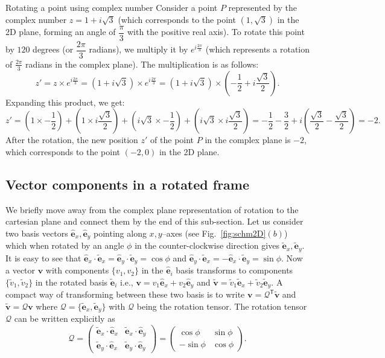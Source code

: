 \documentclass{article}
\def\eh{\hat{\mathbf{e}}}
\def\et{\tilde{\mathbf{e}}}
\def\ehx{\hat{\mathbf{e}}_x}
\def\ehy{\hat{\mathbf{e}}_y}
\def\etx{\tilde{\mathbf{e}}_x}
\def\ety{\tilde{\mathbf{e}}_y}
\def\v{\mathbf{v}}
\def\vt{\tilde{\mathbf{v}}}
\def\vts{\tilde{v}}
\def\Q{\mathcal{Q}}
\def\T{\mathsf{T}}
\begin{document}
\begin{egsBox}[label={egs:rot2Dex1}, float, floatplacement=t]{Rotating a point using complex number}
  \footnotesize
  Consider a point $P$ represented by the complex number $z = 1 + i\sqrt{3}$ (which corresponds to the point $(1, \sqrt{3})$ in the 2D plane, forming an angle of $\dfrac{\pi}{3}$ with the positive real axis). To rotate this point by $120$ degrees (or $\dfrac{2\pi}{3}$ radians), we multiply it by $e^{i\frac{2\pi}{3}}$ (which represents a rotation of $\frac{2\pi}{3}$ radians in the complex plane).
  The multiplication is as follows:
  \[
  z' = z \times e^{i\frac{2\pi}{3}} = (1 + i\sqrt{3}) \times e^{i\frac{2\pi}{3}} = (1 + i\sqrt{3}) \times \left(-\frac{1}{2} + i\frac{\sqrt{3}}{2}\right).
  \]
  Expanding this product, we get:
  \[
  z' = \left(1 \times -\frac{1}{2}\right) + \left(1 \times i\frac{\sqrt{3}}{2}\right) + \left(i\sqrt{3} \times -\frac{1}{2}\right) + \left(i\sqrt{3} \times i\frac{\sqrt{3}}{2}\right) = -\frac{1}{2} - \frac{3}{2} + i\left(\frac{\sqrt{3}}{2} - \frac{\sqrt{3}}{2}\right) = -2.
  \]
  After the rotation, the new position $z'$ of the point $P$ in the complex plane is $-2$, which corresponds to the point $(-2, 0)$ in the 2D plane.
\end{egsBox}

\subsection{Vector components in a rotated frame}\label{sec:VecComp2D}
We briefly move away from the complex plane representation of rotation to the cartesian plane and connect them by the end of this sub-section. Let us consider two basis vectors $\ehx, \ehy$ pointing along $x, y$--axes (see Fig.~\ref{fig:schm2D}$(b)$) which when rotated by an angle $\phi$ in the counter-clockwise direction gives $\etx, \ety$. It is easy to see that $\ehx\cdot\etx=\ehy\cdot\ety=\cos \phi$ and $\ehy\cdot\etx = -\ehx\cdot\ety = \sin \phi$. Now a vector $\v$ with components $\{ v_1, v_2 \}$ in the $\eh_i$ basis transforms to components $\{ \vts_1, \vts_2 \}$ in the rotated basis $\et_i$ i.e., $\v = v_1 \ehx + v_2 \ehy$ and $\vt = \vts_1 \etx + \vts_2 \ety$. A compact way of transforming between these two basis is to write $\v = \Q^\T \vt$ and $\vt = \Q \v$ where $\Q = \{ \etx, \ety \}$ with $\Q$ being the rotation tensor. The rotation tensor $\Q$ can be written explicitly as
\[
  \Q  = \begin{pmatrix} 
  \etx \cdot \ehx & \etx \cdot \ehy \\
  \ety \cdot \ehx & \ety\cdot \ehy
  \end{pmatrix} = 
  \begin{pmatrix} 
  \cos \phi & \sin \phi \\
  -\sin \phi & \cos \phi 
  \end{pmatrix}.
\]
\end{document}

